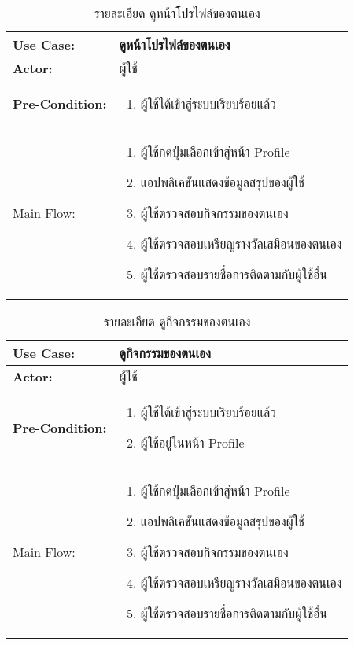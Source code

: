 \begin{table}
    \caption{รายละเอียด ดูหน้าโปรไฟล์ของตนเอง}
    \begin{tabularx}{\textwidth}{ | >{\centering\bf} p{3cm} | X |}
        \hline
        Use Case: & ดูหน้าโปรไฟล์ของตนเอง \\\hline
        Actor: & ผู้ใช้ \\\hline
        Pre-Condition: &
        \begin{enumerate}[table]
            \item ผู้ใช้ได้เข้าสู่ระบบเรียบร้อยแล้ว         
        \end{enumerate} \\\hline
        
        Main Flow: & 
        \begin{enumerate}[table]
            \item ผู้ใช้กดปุ่มเลือกเข้าสู่หน้า Profile
            \item แอปพลิเคชันแสดงข้อมูลสรุปของผู้ใช้
            \item ผู้ใช้ตรวจสอบกิจกรรมของตนเอง
            \item ผู้ใช้ตรวจสอบเหรียญรางวัลเสมือนของตนเอง
            \item ผู้ใช้ตรวจสอบรายชื่อการติดตามกับผู้ใช้อื่น
        \end{enumerate}\\\hline
    \end{tabularx}
\end{table}


\begin{table}
    \caption{รายละเอียด ดูกิจกรรมของตนเอง}
    \begin{tabularx}{\textwidth}{ | >{\centering\bf} p{3cm} | X |}
        \hline
        Use Case: & ดูกิจกรรมของตนเอง \\\hline
        Actor: & ผู้ใช้ \\\hline
        Pre-Condition: &
        \begin{enumerate}[table]
            \item ผู้ใช้ได้เข้าสู่ระบบเรียบร้อยแล้ว
            \item ผู้ใช้อยู่ในหน้า Profile 
        \end{enumerate} \\\hline
        
        Main Flow: & 
        \begin{enumerate}[table]
            \item ผู้ใช้กดปุ่มเลือกเข้าสู่หน้า Profile
            \item แอปพลิเคชันแสดงข้อมูลสรุปของผู้ใช้
            \item ผู้ใช้ตรวจสอบกิจกรรมของตนเอง
            \item ผู้ใช้ตรวจสอบเหรียญรางวัลเสมือนของตนเอง
            \item ผู้ใช้ตรวจสอบรายชื่อการติดตามกับผู้ใช้อื่น
        \end{enumerate}\\\hline
    \end{tabularx}
\end{table}


